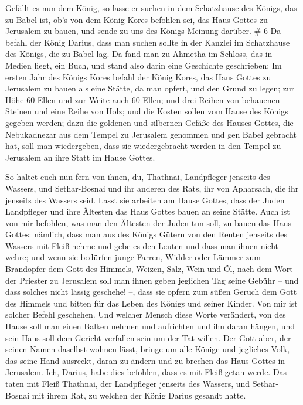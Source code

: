  Gefällt es nun dem König, so lasse er suchen in dem
Schatzhause des Königs, das zu Babel ist, ob's von dem König Kores
befohlen sei, das Haus Gottes zu Jerusalem zu bauen, und sende zu uns
des Königs Meinung darüber. \# 6  Da befahl der König
Darius, dass man suchen sollte in der Kanzlei im Schatzhause des Königs,
die zu Babel lag.  Da fand man zu Ahmetha im Schloss, das
in Medien liegt, ein Buch, und stand also darin eine Geschichte
geschrieben:  Im ersten Jahr des Königs Kores befahl der
König Kores, das Haus Gottes zu Jerusalem zu bauen als eine Stätte, da
man opfert, und den Grund zu legen; zur Höhe 60 Ellen und zur Weite auch
60 Ellen;  und drei Reihen von behauenen Steinen und eine
Reihe von Holz; und die Kosten sollen vom Hause des Königs gegeben
werden;  dazu die goldenen und silbernen Gefäße des Hauses
Gottes, die Nebukadnezar aus dem Tempel zu Jerusalem genommen und gen
Babel gebracht hat, soll man wiedergeben, dass sie wiedergebracht werden
in den Tempel zu Jerusalem an ihre Statt im Hause Gottes.

 So haltet euch nun fern von ihnen, du, Thathnai,
Landpfleger jenseits des Wassers, und Sethar-Bosnai und ihr anderen des
Rats, ihr von Apharsach, die ihr jenseits des Wassers seid.
 Lasst sie arbeiten am Hause Gottes, dass der Juden
Landpfleger und ihre Ältesten das Haus Gottes bauen an seine Stätte.
 Auch ist von mir befohlen, was man den Ältesten der Juden
tun soll, zu bauen das Haus Gottes: nämlich, dass man aus des Königs
Gütern von den Renten jenseits des Wassers mit Fleiß nehme und gebe es
den Leuten und dass man ihnen nicht wehre;  und wenn sie
bedürfen junge Farren, Widder oder Lämmer zum Brandopfer dem Gott des
Himmels, Weizen, Salz, Wein und Öl, nach dem Wort der Priester zu
Jerusalem soll man ihnen geben jeglichen Tag seine Gebühr -- und dass
solches nicht lässig geschehe! --,  dass sie opfern zum
süßen Geruch dem Gott des Himmels und bitten für das Leben des Königs
und seiner Kinder.  Von mir ist solcher Befehl geschehen.
Und welcher Mensch diese Worte verändert, von des Hause soll man einen
Balken nehmen und aufrichten und ihn daran hängen, und sein Haus soll
dem Gericht verfallen sein um der Tat willen.  Der Gott
aber, der seinen Namen daselbst wohnen lässt, bringe um alle Könige und
jegliches Volk, das seine Hand ausreckt, daran zu ändern und zu brechen
das Haus Gottes in Jerusalem. Ich, Darius, habe dies befohlen, dass es
mit Fleiß getan werde.  Das taten mit Fleiß Thathnai, der
Landpfleger jenseits des Wassers, und Sethar-Bosnai mit ihrem Rat, zu
welchen der König Darius gesandt hatte.

